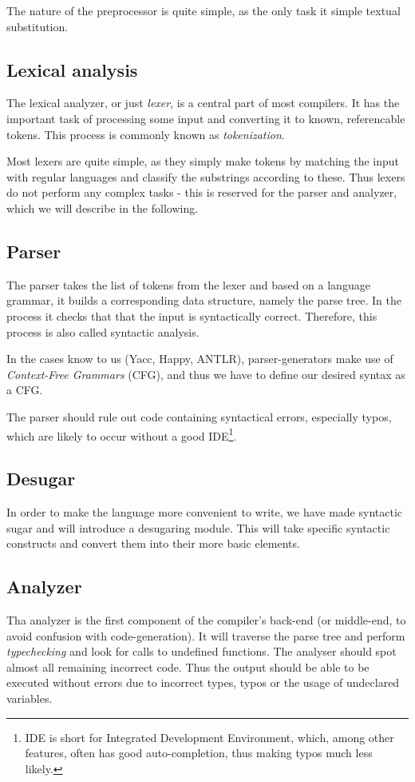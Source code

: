 The nature of the preprocessor is quite simple, as the only task it
simple textual substitution.


\subsection{Lexical analysis}
The lexical analyzer, or just \emph{lexer}, is a central part of most
compilers. It has the important task of processing some input and
converting it to known, referencable tokens. This process is commonly
known as \emph{tokenization}.

Most lexers are quite simple, as they simply make tokens by matching the input with regular languages and classify the substrings according to these. Thus lexers do not perform any complex tasks - this is reserved for the parser and analyzer, which we will describe in the following.


\subsection{Parser}
The parser takes the list of tokens from the lexer and based on a
language grammar, it builds a corresponding data structure, namely the
parse tree. In the process it checks that that the input is
syntactically correct. Therefore, this process is also called syntactic
analysis.

In the cases know to us (Yacc, Happy, ANTLR), parser-generators make use of \emph{Context-Free Grammars} (CFG), and thus we have to define our desired syntax as a CFG.

The parser should rule out code containing syntactical errors, especially typos, which are likely to occur without a good IDE\footnote{IDE is short for Integrated Development Environment, which, among other features, often has good auto-completion, thus making typos much less likely.}.


\subsection{Desugar}
In order to make the language more convenient to write, we have made syntactic sugar and will introduce a desugaring module. This will take specific syntactic constructs and convert them into their more basic elements.


\subsection{Analyzer}
Tha analyzer is the first component of the compiler's back-end (or middle-end, to avoid confusion with code-generation). It will traverse the parse tree and perform \emph{typechecking} and look for calls to undefined functions. The analyser should spot almost all remaining incorrect code. Thus the output should be able to be executed without errors due to incorrect types, typos or the usage of undeclared variables.

